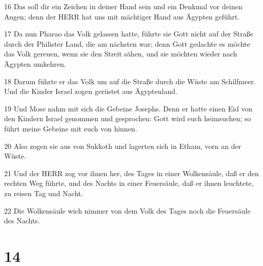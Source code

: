 \par 16 Das soll dir ein Zeichen in deiner Hand sein und ein Denkmal vor deinen Augen; denn der HERR hat uns mit mächtiger Hand aus Ägypten geführt.
\par 17 Da nun Pharao das Volk gelassen hatte, führte sie Gott nicht auf der Straße durch der Philister Land, die am nächsten war; denn Gott gedachte es möchte das Volk gereuen, wenn sie den Streit sähen, und sie möchten wieder nach Ägypten umkehren.
\par 18 Darum führte er das Volk um auf die Straße durch die Wüste am Schilfmeer. Und die Kinder Israel zogen gerüstet aus Ägyptenland.
\par 19 Und Mose nahm mit sich die Gebeine Josephs. Denn er hatte einen Eid von den Kindern Israel genommen und gesprochen: Gott wird euch heimsuchen; so führt meine Gebeine mit euch von hinnen.
\par 20 Also zogen sie aus von Sukkoth und lagerten sich in Etham, vorn an der Wüste.
\par 21 Und der HERR zog vor ihnen her, des Tages in einer Wolkensäule, daß er den rechten Weg führte, und des Nachts in einer Feuersäule, daß er ihnen leuchtete, zu reisen Tag und Nacht.
\par 22 Die Wolkensäule wich nimmer von dem Volk des Tages noch die Feuersäule des Nachts.

\chapter{14}

